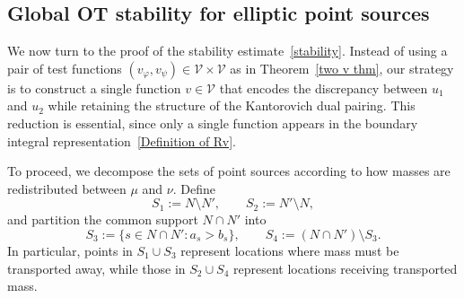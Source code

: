 \documentclass[12pt]{amsart}
\begin{document}
\subsection{Global OT stability for elliptic point sources}\label{Main for elliptic}

We now turn to the proof of the stability estimate~\eqref{stability}.  
Instead of using a pair of test functions \( (v_\varphi, v_\psi) \in \mathcal{V}\times\mathcal{V} \) as in Theorem~\ref{two v thm}, our strategy is to construct a single function \(v\in\mathcal{V}\) that encodes the discrepancy between \(u_1\) and \(u_2\) while retaining the structure of the Kantorovich dual pairing.  
This reduction is essential, since only a single function appears in the boundary integral representation~\eqref{Definition of Rv}.

To proceed, we decompose the sets of point sources according to how masses are redistributed between \(\mu\) and \(\nu\).  
Define
\[
S_1 := N\setminus N', \qquad 
S_2 := N'\setminus N,
\]
and partition the common support \(N\cap N'\) into
\[
S_3 := \{s\in N\cap N' : a_s>b_s\}, \qquad 
S_4 := (N\cap N')\setminus S_3.
\]
In particular, points in \(S_1\cup S_3\) represent locations where mass must be transported away, while those in \(S_2\cup S_4\) represent locations receiving transported mass.

\end{document}
